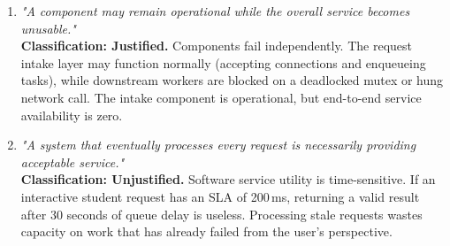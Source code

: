 \documentclass[11pt]{article}
\begin{document}
\begin{enumerate}[label=\textbf{Statement \arabic*:}, leftmargin=1.6em, itemsep=0.4em]
    \item \textit{"A component may remain operational while the overall service becomes unusable."}\\
    \textbf{Classification: Justified.} Components fail independently. The request intake layer may function normally (accepting connections and enqueueing tasks), while downstream workers are blocked on a deadlocked mutex or hung network call. The intake component is operational, but end-to-end service availability is zero.

    \item \textit{"A system that eventually processes every request is necessarily providing acceptable service."}\\
    \textbf{Classification: Unjustified.} Software service utility is time-sensitive. If an interactive student request has an SLA of 200\,ms, returning a valid result after 30 seconds of queue delay is useless. Processing stale requests wastes capacity on work that has already failed from the user's perspective.
\end{enumerate}

\newpage
\end{document}
